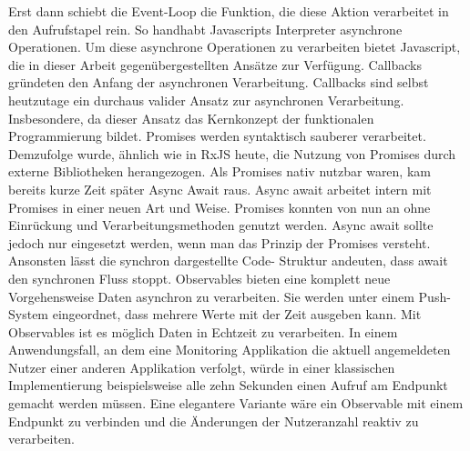 \noindent
Erst dann schiebt die Event-Loop die Funktion, die diese Aktion verarbeitet in den Aufrufstapel rein. So handhabt Javascripts Interpreter asynchrone Operationen. Um diese asynchrone Operationen zu verarbeiten bietet Javascript, die in dieser Arbeit gegenübergestellten Ansätze zur Verfügung. Callbacks gründeten den Anfang der asynchronen Verarbeitung. Callbacks sind selbst heutzutage ein durchaus valider Ansatz zur asynchronen Verarbeitung. Insbesondere, da dieser Ansatz das Kernkonzept der funktionalen Programmierung bildet. Promises werden syntaktisch \glqq sauberer\grqq{} verarbeitet. Demzufolge wurde, ähnlich wie in RxJS heute, die Nutzung von Promises durch externe Bibliotheken herangezogen. Als Promises nativ nutzbar waren, kam bereits kurze Zeit später Async Await raus. Async await arbeitet intern mit Promises in einer neuen Art und Weise. Promises konnten von nun an ohne Einrückung und Verarbeitungsmethoden genutzt werden. Async await sollte jedoch nur eingesetzt werden, wenn man das Prinzip der Promises versteht. Ansonsten lässt die synchron dargestellte Code- Struktur andeuten, dass await den synchronen Fluss stoppt. Observables bieten eine komplett neue Vorgehensweise Daten asynchron zu verarbeiten. Sie werden unter einem Push-System eingeordnet, dass mehrere Werte mit der Zeit ausgeben kann. Mit Observables ist es möglich Daten in Echtzeit zu verarbeiten. In einem Anwendungsfall, an dem eine Monitoring Applikation die aktuell angemeldeten Nutzer einer anderen Applikation verfolgt, würde in einer klassischen Implementierung beispielsweise alle zehn Sekunden einen Aufruf am Endpunkt gemacht werden müssen. Eine elegantere Variante wäre ein Observable mit einem Endpunkt zu verbinden und die Änderungen der Nutzeranzahl reaktiv zu verarbeiten.
